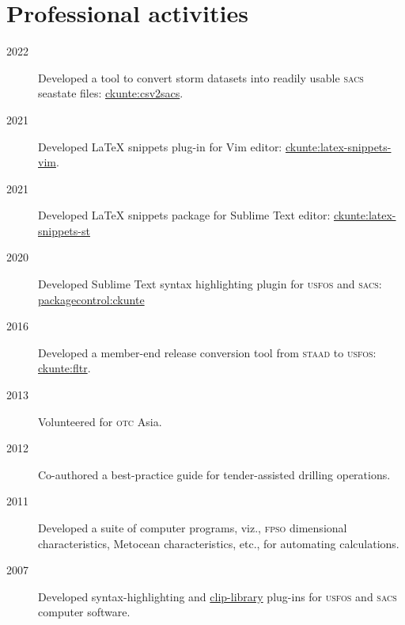 \section*{Professional activities} %
\label{sec:prof_activities}

\begin{description}
\item[2022]Developed a tool to convert storm datasets into readily usable \textsc{sacs} seastate files: \href{https://github.com/ckunte/csv2sacs}{ckunte:csv2sacs}.

\item[2021]Developed {\LaTeX} snippets plug-in for Vim editor: \href{https://github.com/ckunte/latex-snippets-vim}{ckunte:latex-snippets-vim}.

\item[2021]Developed {\LaTeX} snippets package for Sublime Text editor: \href{https://github.com/ckunte/latex-snippets-st}{ckunte:latex-snippets-st}

\item[2020]Developed Sublime Text syntax highlighting plugin for \textsc{usfos} and \textsc{sacs}: \href{https://packagecontrol.io/browse/authors/ckunte}{packagecontrol:ckunte}

\item[2016]Developed a member-end release conversion tool from \textsc{staad} to \textsc{usfos}: \href{https://gist.github.com/ckunte/98fc79713b8d111b0aa6fec792b194b3}{ckunte:fltr}.

\item[2013]Volunteered for \textsc{otc} Asia.

\item[2012]Co-authored a best-practice guide for tender-assisted drilling operations.

\item[2011]Developed a suite of computer programs, viz., \textsc{fpso} dimensional characteristics, Metocean characteristics, etc., for automating calculations.


\item[2007]Developed syntax-highlighting and \href{https://www.textpad.com/addons/cliplibs}{clip-library} plug-ins for \textsc{usfos} and \textsc{sacs} computer software.

\end{description}

